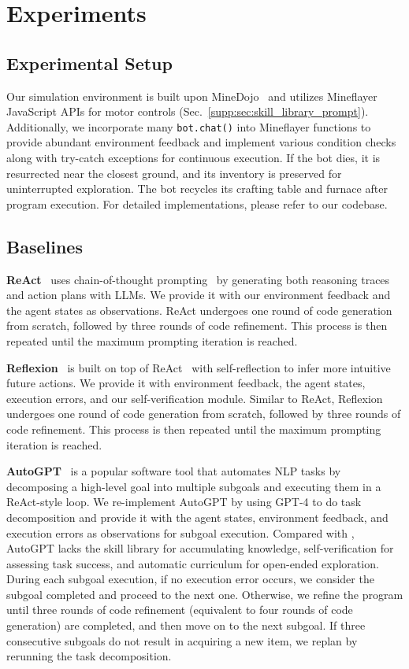 \section{Experiments}
\label{supp:sec:experiments}
\subsection{Experimental Setup}
\label{supp:sec:experimental_setup}
Our simulation environment is built upon MineDojo~\cite{fan2022minedojo} and utilizes Mineflayer~\cite{mineflayer} JavaScript APIs for motor controls (Sec.~\ref{supp:sec:skill_library_prompt}). Additionally, we incorporate many \texttt{bot.chat()} into Mineflayer functions to provide abundant environment feedback and implement various condition checks along with try-catch exceptions for continuous execution. If the bot dies, it is resurrected near the closest ground, and its inventory is preserved for uninterrupted exploration. The bot recycles its crafting table and furnace after program execution. For detailed implementations, please refer to our codebase.

\subsection{Baselines}
\textbf{ReAct}~\cite{yao2022react} uses chain-of-thought prompting~\cite{wei2022chain} by generating both reasoning traces and action plans with LLMs. We provide it with our environment feedback and the agent states as observations. ReAct undergoes one round of code generation from scratch, followed by three rounds of code refinement. This process is then repeated until the maximum prompting iteration is reached.

\textbf{Reflexion}~\cite{shinn2023reflexion} is built on top of ReAct~\cite{yao2022react} with self-reflection to infer more intuitive future actions. We provide it with environment feedback, the agent states, execution errors, and our self-verification module. Similar to ReAct, Reflexion undergoes one round of code generation from scratch, followed by three rounds of code refinement. This process is then repeated until the maximum prompting iteration is reached.

\textbf{AutoGPT}~\cite{autogpt} is a popular software tool that automates NLP tasks by decomposing a high-level goal into multiple subgoals and executing them in a ReAct-style loop. We re-implement AutoGPT by using GPT-4 to do task decomposition and provide it with the agent states, environment feedback, and execution errors as observations for subgoal execution. Compared with \voyager, AutoGPT lacks the skill library for accumulating knowledge, self-verification for assessing task success, and automatic curriculum for open-ended exploration. During each subgoal execution, if no execution error occurs, we consider the subgoal completed and proceed to the next one. Otherwise, we refine the program until three rounds of code refinement (equivalent to four rounds of code generation) are completed, and then move on to the next subgoal. If three consecutive subgoals do not result in acquiring a new item, we replan by rerunning the task decomposition.

